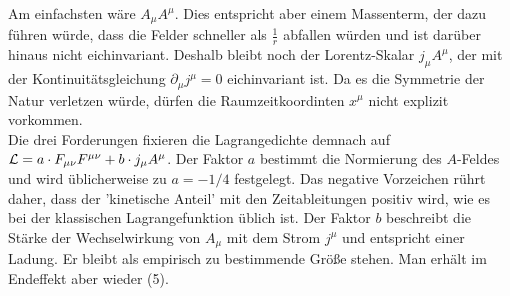 Am einfachsten wäre $A_{\mu} A^{\mu}$. Dies entspricht aber einem Massenterm, der dazu führen würde, dass die Felder schneller als $\frac{1}{r}$ abfallen würden und ist darüber hinaus nicht eichinvariant. Deshalb bleibt noch der Lorentz-Skalar $j_{\mu} A^{\mu}$, der mit der Kontinuitätsgleichung $\partial_{\mu} j^{\mu} = 0$ eichinvariant ist. Da es die Symmetrie der Natur verletzen würde, dürfen die Raumzeitkoordinten $x^{\mu}$ nicht explizit vorkommen. \\

Die drei Forderungen fixieren die Lagrangedichte demnach auf $\mathcal{L} = a \cdot F_{\mu \nu} F^{\mu \nu} + b \cdot j_{\mu} A^{\mu}$. Der Faktor $a$ bestimmt die Normierung des $A$-Feldes und wird üblicherweise zu $a = - 1/4$ festgelegt. Das negative Vorzeichen rührt daher, dass der 'kinetische Anteil' mit den Zeitableitungen positiv wird, wie es bei der klassischen Lagrangefunktion üblich ist.
Der Faktor $b$ beschreibt die Stärke der Wechselwirkung von $A_{\mu}$ mit dem Strom $j^{\mu}$ und entspricht einer Ladung. Er bleibt als empirisch zu bestimmende Größe stehen. Man erhält im Endeffekt aber wieder (5).
